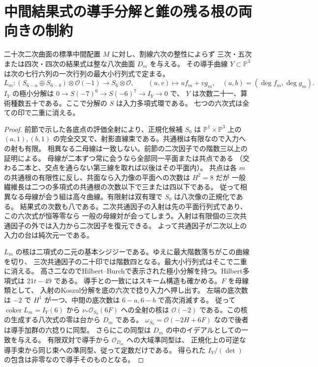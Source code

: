 \section{中間結果式の導手分解と錐の残る根の両向きの制約}
\label{sec:middle-conductor-resolution}
\begin{theorem}\label{thm:middle-conductor-resolution}
二十次二次曲面の標準中間配置 $M$ に対し、割線六次の整性によらず
三次・五次または四次・四次の結果式は整な八次曲面 $D_m$ を与える。
その導手曲線 $Y\subset\mathbb P^3$ は次の七行六列の一次行列の最大小行列式で定まる。
\[
 L_m:(S_{6-a}\oplus S_{6-b})\otimes\mathcal O(-1)\longrightarrow S_6\otimes\mathcal O,
       \qquad (u,v)\longmapsto u f_m+v g_m,\quad (a,b)=(\deg f_m,\deg g_m).
\]
$I_Y$ の極小分解は $0\to S(-7)^6\to S(-6)^7\to I_Y\to0$ で、
$Y$ は次数二十一、算術種数五十である。ここで分解の $S$ は入力多項式環である。
七つの六次式は全ての印で二重に消える。
\end{theorem}
\begin{proof}
前節で示した各底点の評価全射により、正規化候補 $S_0$ は
$\mathbb P^1\times\mathbb P^3$ 上の $(a,1),(b,1)$ の完全交叉で、射影直線束である。共通根は有限なので入力への射も有限。
相異なる二母線は一致しない。前節の二次因子での階数三以上の証明による。
母線が二本ずつ常に会うなら全部同一平面または共点である
（交わる二本と、交点を通らない第三線を取れば以後はその平面内）。
共点は各 $m$ の共通根の有限性に反し、共面なら入力像の平面への次数は $H^2=8$ だが
一般繊維長は二つの多項式の共通根の次数以下で三または四以下である。
従って相異なる母線が会う組は高々曲線。有限射は双有理で $S_0$ は八次像の正規化である。
結果式の次数も八である。二次共通因子の入射は先の平面行列式であり、この六次式が恒等零なら
一般の母線対が会ってしまう。入射は有限個の三次共通因子の外では入力から二次因子を復元できる。
よって共通因子が二次以上の入力の台は純次元一である。

$L_m$ の核は二項式の二元の基本シジジーである。ゆえに最大階数落ちがこの曲線を切り、
三次共通因子の二十印では階数四となる。最大小行列式はそこで二重に消える。
高さ二なのでHilbert--Burchで表示された極小分解を持つ。Hilbert多項式は $21t-49$ である。
導手との一致にはスキーム構造も確かめる。$F$ を母線類として、
入射のKoszul分解を底の六次で捻り入力へ押し出す。
左端の底次数は $-2$ で $H^1$ が一つ、中間の底次数は $6-a,6-b$ で高次消滅する。
従って $\operatorname{coker}L_m=I_Y(6)$ から $\nu_*\mathcal O_{S_0}(6F)$ への全射の核は
$\mathcal O(-2)$ である。この核の生成する八次式の零は台から $D_m$ である。
$\omega_{S_0}=\mathcal O(-2H+6F)$ なので後者は導手加群の六捻りに同型。
さらにこの同型は $D_m$ の中のイデアルとしての一致を与える。
有限双対で導手から $\mathcal O_{D_m}$ への大域準同型は、
正規化上の可逆な導手束から同じ束への準同型、従って定数だけである。
得られた $I_Y/(\det)$ の包含は非零なので導手そのものとなる。
\end{proof}

